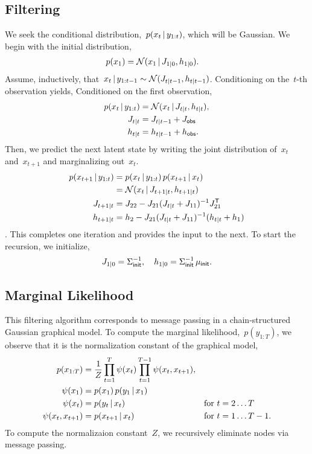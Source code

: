 \documentclass{article}
\begin{document}
\subsection*{Filtering}
We seek the conditional distribution,~$p(x_t \,|\, y_{1:t})$, which 
will be Gaussian. We begin with the initial distribution, 
\begin{align}
  p(x_1) &= \mathcal{N}(x_1 \,|\, J_{1 | 0}, h_{1 | 0}).
\end{align}
Assume, inductively, that~$x_t \,|\, y_{1:t-1} \sim \mathcal{N}(J_{t|t-1}, h_{t|t-1})$. Conditioning on the~$t$-th observation yields,
Conditioned on the first observation,
\begin{align}
  p(x_t \,|\, y_{1:t}) &= \mathcal{N}(x_t \,|\, J_{t|t}, h_{t|t}), \\
  J_{t|t} &= J_{t|t-1} + J_{\sf obs} \\
  h_{t|t} &= h_{t|t-1} + h_{\sf obs}.
\end{align}
Then, we predict the next latent state by writing the joint distribution of~$x_t$ and~$x_{t+1}$ and marginalizing out~$x_t$.
\begin{align}
  p(x_{t+1} \,|\, y_{1:t}) &= p(x_t \,|\, y_{1:t}) \, p(x_{t+1} \,|\, x_t) \\
  &= \mathcal{N}(x_t \,|\, J_{t+1|t}, h_{t+1|t}) \\
  J_{t+1|t} &= J_{22} - J_{21} (J_{t|t} + J_{11})^{-1}J_{21}^{\mathsf{T}} \\
  h_{t+1|t} &= h_2 - J_{21} (J_{t|t} + J_{11})^{-1} (h_{t|t} + h_1)
\end{align}.
This completes one iteration and provides the input to the next. To start the recursion, we initialize,
\begin{align}
  J_{1|0} = \Sigma_{\sf init}^{-1}, \quad
  h_{1|0} = \Sigma_{\sf init}^{-1} \, \mu_{\sf init}.
\end{align}

\subsection*{Marginal Likelihood}
This filtering algorithm corresponds to message passing
in a chain-structured Gaussian graphical model. To compute
the marginal likelihood,~$p(y_{1:T})$, we observe that it
is the normalization constant of the graphical model,
\begin{align}
  p(x_{1:T}) &=
  \frac{1}{Z} \prod_{t=1}^T \psi(x_t) \prod_{t=1}^{T-1} \psi(x_t, x_{t+1}), & & \\
  \psi(x_1) &= p(x_1) \, p(y_1 \,|\, x_1)  & & \\
  \psi(x_t) &= p(y_t \,|\, x_t)  & \text{for } t&=2 \ldots T \\
  \psi(x_t, x_{t+1}) &= p(x_{t+1} \,|\, x_t)  & \text{for } t&=1 \ldots T-1.
\end{align}
To compute the normalizaion constant~$Z$, we recursively eliminate nodes
via message passing.
\end{document}
